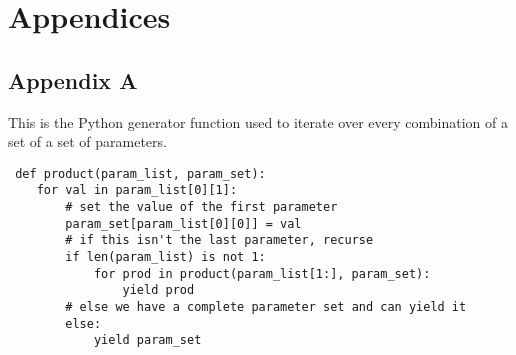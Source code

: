 \chapter{Appendices}
\section{Appendix A}
This is the Python generator function used to iterate over every combination of a set of a set of parameters.
\begin{lstlisting}
 def product(param_list, param_set):
    for val in param_list[0][1]:
        # set the value of the first parameter
        param_set[param_list[0][0]] = val
        # if this isn't the last parameter, recurse
        if len(param_list) is not 1:
            for prod in product(param_list[1:], param_set):
                yield prod
        # else we have a complete parameter set and can yield it
        else:
            yield param_set
\end{lstlisting}
